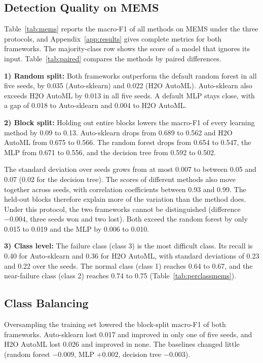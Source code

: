 \subsection{Detection Quality on MEMS}
Table~\ref{tab:mems} reports the macro-F1 of all methods on MEMS under the three protocols, and Appendix~\ref{app:results} gives complete metrics for both frameworks. The majority-class row shows the score of a model that ignores its input. Table~\ref{tab:paired} compares the methods by paired differences.

\textbf{1) Random split:} Both frameworks outperform the default random forest in all five seeds, by 0.035 (Auto-sklearn) and 0.022 (H2O AutoML). Auto-sklearn also exceeds H2O AutoML by 0.013 in all five seeds. A default MLP stays close, with a gap of 0.018 to Auto-sklearn and 0.004 to H2O AutoML.

\textbf{2) Block split:} Holding out entire blocks lowers the macro-F1 of every learning method by 0.09 to 0.13. Auto-sklearn drops from 0.689 to 0.562 and H2O AutoML from 0.675 to 0.566. The random forest drops from 0.654 to 0.547, the MLP from 0.671 to 0.556, and the decision tree from 0.592 to 0.502.

The standard deviation over seeds grows from at most 0.007 to between 0.05 and 0.07 (0.02 for the decision tree). The scores of different methods also move together across seeds, with correlation coefficients between 0.93 and 0.99. The held-out blocks therefore explain more of the variation than the method does. Under this protocol, the two frameworks cannot be distinguished (difference $-0.004$, three seeds won and two lost). Both exceed the random forest by only 0.015 to 0.019 and the MLP by 0.006 to 0.010.

\textbf{3) Class level:} The failure class (class 3) is the most difficult class. Its recall is 0.40 for Auto-sklearn and 0.36 for H2O AutoML, with standard deviations of 0.23 and 0.22 over the seeds. The normal class (class 1) reaches 0.64 to 0.67, and the near-failure class (class 2) reaches 0.74 to 0.75 (Table~\ref{tab:perclassmems}).



\subsection{Class Balancing}
Oversampling the training set lowered the block-split macro-F1 of both frameworks. Auto-sklearn lost 0.017 and improved in only one of five seeds, and H2O AutoML lost 0.026 and improved in none. The baselines changed little (random forest $-0.009$, MLP $+0.002$, decision tree $-0.003$).

